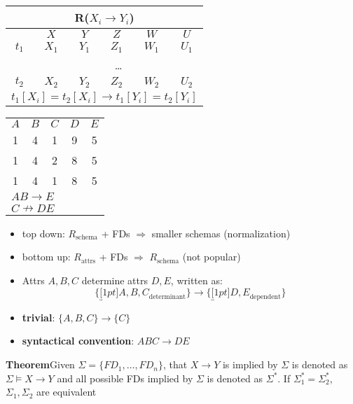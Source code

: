 \begin{minipage}{0.5\linewidth}
  \centering
  \begin{tabular}{c|ccccc}
    \hline
    \multicolumn{6}{c}{R($X_{i} \rightarrow Y_{i}$)}\\
    \hline
    & $X$ & $Y$ & $Z$ & $W$ & $U$ \\
    $t_{1}$ & $X_{1}$ & $Y_{1}$ & $Z_{1}$ & $W_{1}$ & $U_{1}$ \\
    & \multicolumn{5}{c}{\ldots}\\
    $t_{2}$ & $X_{2}$ & $Y_{2}$ & $Z_{2}$ & $W_{2}$ & $U_{2}$ \\
    \hline
    \multicolumn{6}{l}{$t_{1}[X_{i}] = t_{2}[X_{i}] \rightarrow t_{1}[Y_{i}] = t_{2}[Y_{i}]$}\\
    \hline
\end{tabular}
\end{minipage}
\begin{minipage}{0.5\linewidth}
  \centering
  \begin{tabular}{ccccc}
    \hline
    $A$ & $B$ & $C$ & $D$ & $E$ \\
    1 & 4 & 1 & 9 & 5 \\
    1 & 4 & 2 & 8 & 5 \\
    1 & 4 & 1 & 8 & 5 \\
    \hline
    \multicolumn{5}{l}{$AB \rightarrow E$}\\
    \multicolumn{5}{l}{$C \nrightarrow DE$}\\
    \hline
\end{tabular}
\end{minipage}

\begin{itemize}
\item top down: $R_{\text{schema}}$ + FDs \(\Rightarrow\) smaller schemas (normalization)
\item bottom up: $R_{\text{attrs}}$ + FDs $\Rightarrow$ $R_{\text{schema}}$ (not popular)
\item Attrs $A,B,C$ determine attrs $D,E$, written as:
  \begin{displaymath}
\{\underbracket[1pt]{A,B,C}_{\text{determinant}}\} \rightarrow \{\underbracket[1pt]{D,E}_{\text{dependent}}\}
\end{displaymath}
\item \textbf{trivial}: $\{A,B,C\} \rightarrow \{C\}$
\item \textbf{syntactical convention}: $ABC \rightarrow DE$
\end{itemize}
\textbf{Theorem}\quad Given $\Sigma = \{FD_{1},\ldots,FD_{n}\}$, that $X \rightarrow Y$ is implied by $\Sigma$ is denoted as $\Sigma \models X \rightarrow Y$ and all possible FDs implied by $\Sigma$ is denoted as $\Sigma^{*}$.  If $\Sigma^{*}_{1} = \Sigma^{*}_{2}$, $\Sigma_{1}, \Sigma_{2}$ are equivalent

